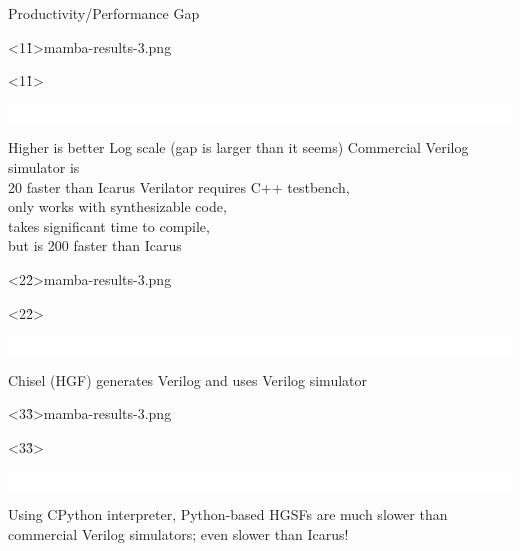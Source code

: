 \begin{frame}{Productivity/Performance Gap}

\cbxfigc<1\h1>{mamba-results-3.png}
\begin{onlyenv}<1\h1>
\vspace{-2in}\hfill
\colorbox{white}{%
  \begin{minipage}[c][2in][t]{0.8\tw}
    \mbox{\ }
  \end{minipage}
}

\vspace{-1.75in}\hspace*{1.25in}
\begin{cbxlist}
  \1 Higher is better
  \1 Log scale (gap is larger than it seems)
  \1 Commercial Verilog simulator is \\ 20\X{} faster than Icarus
 \1 Verilator requires C++ testbench, \\ only works with synthesizable
  code, \\ takes significant time to compile, \\ but is 200\X{} faster than
  Icarus
\end{cbxlist}
\end{onlyenv}

\cbxfigc<2\h2>{mamba-results-3.png}
\begin{onlyenv}<2\h2>
\vspace{-2in}\hfill
\colorbox{white}{%
  \begin{minipage}[c][2in][t]{0.67\tw}
    \mbox{\ }
  \end{minipage}
}

\medskip
\begin{cbxlist}[t]
  \1 Chisel (HGF) generates Verilog and uses Verilog simulator
\end{cbxlist}
\end{onlyenv}

\cbxfigc<3\h3>{mamba-results-3.png}
\begin{onlyenv}<3\h3>
\vspace{-1.9in}\hfill
\colorbox{white}{%
  \begin{minipage}[c][1.9in][t]{0.088\tw}
    \mbox{\ }
  \end{minipage}
}

\medskip
\begin{cbxlist}[t]
  \1 Using CPython interpreter, Python-based HGSFs are much slower than
  commercial Verilog simulators; even slower than Icarus!
\end{cbxlist}
\end{onlyenv}


\end{frame}
